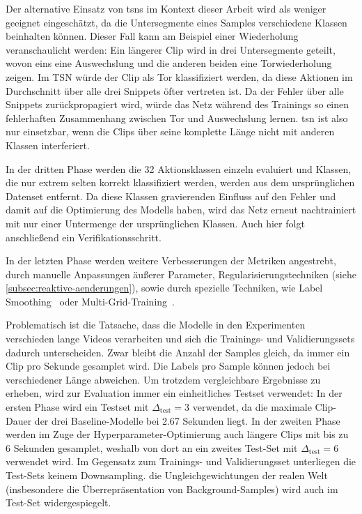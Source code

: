 Der alternative Einsatz von \glspl{tsn} im Kontext dieser Arbeit wird als weniger geeignet eingeschätzt, da die Untersegmente eines Samples verschiedene Klassen beinhalten können.
Dieser Fall kann am Beispiel einer Wiederholung veranschaulicht werden:
Ein längerer Clip wird in drei Untersegmente geteilt, wovon eins eine Auswechslung und die anderen beiden eine Torwiederholung zeigen.
Im TSN würde der Clip als Tor klassifiziert werden, da diese Aktionen im Durchschnitt über alle drei Snippets öfter vertreten ist.
Da der Fehler über alle Snippets zurückpropagiert wird, würde das Netz während des Trainings so einen fehlerhaften Zusammenhang zwischen Tor und Auswechslung lernen.
\gls{tsn} ist also nur einsetzbar, wenn die Clips über seine komplette Länge nicht mit anderen Klassen interferiert.

In der dritten Phase werden die 32 Aktionsklassen einzeln evaluiert und Klassen, die nur extrem selten korrekt klassifiziert werden, werden aus dem ursprünglichen Datenset entfernt.
Da diese Klassen gravierenden Einfluss auf den Fehler und damit auf die Optimierung des Modells haben, wird das Netz erneut nachtrainiert mit nur einer Untermenge der ursprünglichen Klassen.
Auch hier folgt anschließend ein Verifikationsschritt.

In der letzten Phase werden weitere Verbesserungen der Metriken angestrebt, durch manuelle Anpassungen äußerer Parameter, Regularisierungstechniken (siehe \autoref{subsec:reaktive-aenderungen}), sowie durch spezielle Techniken, wie Label Smoothing~\cite{Szegedy16} oder Multi-Grid-Training~\cite{Wu20}.

Problematisch ist die Tatsache, dass die Modelle in den Experimenten verschieden lange Videos verarbeiten und sich die Trainings- und Validierungssets dadurch unterscheiden.
Zwar bleibt die Anzahl der Samples gleich, da immer ein Clip pro Sekunde gesamplet wird.
Die Labels pro Sample können jedoch bei verschiedener Länge abweichen.
Um trotzdem vergleichbare Ergebnisse zu erheben, wird zur Evaluation immer ein einheitliches Testset verwendet:
In der ersten Phase wird ein Testset mit $\Delta_\text{test}=3$ verwendet, da die maximale Clip-Dauer der drei Baseline-Modelle bei 2.67 Sekunden liegt.
In der zweiten Phase werden im Zuge der Hyperparameter-Optimierung auch längere Clips mit bis zu 6 Sekunden gesamplet, weshalb von dort an ein zweites Test-Set mit $\Delta_\text{test}=6$ verwendet wird.
Im Gegensatz zum Trainings- und Validierungsset unterliegen die Test-Sets keinem Downsampling.
\Dh die Ungleichgewichtungen der realen Welt (insbesondere die Überrepräsentation von Background-Samples) wird auch im Test-Set widergespiegelt.


